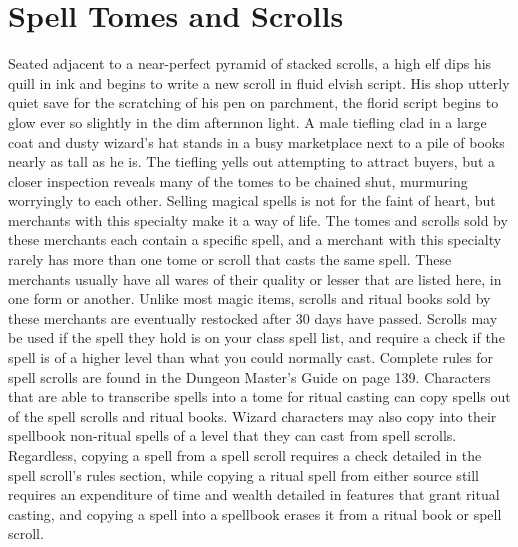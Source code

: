 \documentclass[10pt,a4paper,twoside,twocolumn,openany,nodeprecatedcode,bg=print]{dndbook}
\begin{document}
\section{Spell Tomes and Scrolls}
Seated adjacent to a near-perfect pyramid of stacked scrolls, a high elf dips his quill in ink and begins to write a new scroll in fluid elvish script. His shop utterly quiet save for the scratching of his pen on parchment, the florid script begins to glow ever so slightly in the dim afternnon light.
A male tiefling clad in a large coat and dusty wizard's hat stands in a busy marketplace next to a pile of books nearly as tall as he is. The tiefling yells out attempting to attract buyers, but a closer inspection reveals many of the tomes to be chained shut, murmuring worryingly to each other.
Selling magical spells is not for the faint of heart, but merchants with this specialty make it a way of life. The tomes and scrolls sold by these merchants each contain a specific spell, and a merchant with this specialty rarely has more than one tome or scroll that casts the same spell. These merchants usually have all wares of their quality or lesser that are listed here, in one form or another.
Unlike most magic items, scrolls and ritual books sold by these merchants are eventually restocked after 30 days have passed. Scrolls may be used if the spell they hold is on your class spell list, and require a check if the spell is of a higher level than what you could normally cast. Complete rules for spell scrolls are found in the Dungeon Master's Guide on page 139.
Characters that are able to transcribe spells into a tome for ritual casting can copy spells out of the spell scrolls and ritual books. Wizard characters may also copy into their spellbook non-ritual spells of a level that they can cast from spell scrolls. Regardless, copying a spell from a spell scroll requires a check detailed in the spell scroll's rules section, while copying a ritual spell from either source still requires an expenditure of time and wealth detailed in features that grant ritual casting, and copying a spell into a spellbook erases it from a ritual book or spell scroll.
\end{document}
